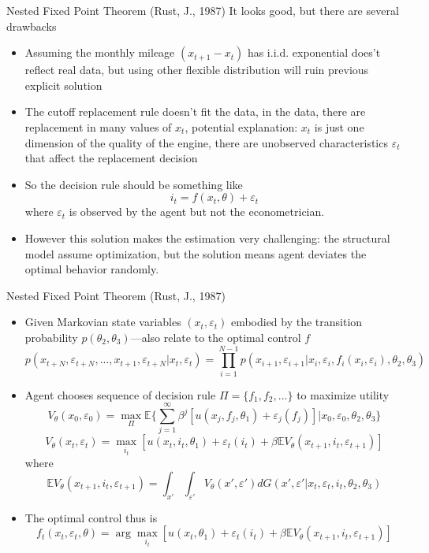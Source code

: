 \documentclass[10pt]{beamer}
\begin{document}
\begin{frame}{Nested Fixed Point Theorem (Rust, J., 1987)}
It looks good, but there are several drawbacks
\begin{itemize}
\item Assuming the monthly mileage $(x_{t+1}-x_t)$ has i.i.d. exponential does't reflect real data, but using other flexible distribution will ruin previous explicit solution
\item The cutoff replacement rule doesn't fit the data, in the data, there are replacement in many values of $x_t$, potential explanation: $x_t$ is just one dimension of the quality of the engine, there are unobserved characteristics $\varepsilon_t$ that affect the replacement decision
\item So the decision rule should be something like
 $$i_t = f(x_t,\theta)+\varepsilon_t$$
where $\varepsilon_t$ is observed by the agent but not the econometrician.
\item However this solution makes the estimation very challenging: the structural model assume optimization, but the solution means agent deviates the optimal behavior randomly.
\end{itemize}
\end{frame}


\begin{frame}{Nested Fixed Point Theorem (Rust, J., 1987)}
\begin{itemize}
\item Given Markovian state variables $(x_t,\varepsilon_t)$ embodied by the transition probability $p(\theta_2,\theta_3)$---also relate to the optimal control $f$
$$p(x_{t+N},\varepsilon_{t+N},...,x_{t+1},\varepsilon_{t+N}|x_t,\varepsilon_t)=\prod_{i=1}^{N-1}p(x_{i+1},\varepsilon_{i+1}|x_i,\varepsilon_i,f_i(x_i,\varepsilon_i),\theta_2,\theta_3)$$
\item Agent chooses sequence of decision rule $\Pi=\{f_1,f_2,...\}$ to maximize utility
 $$V_\theta(x_0,\varepsilon_0)=\max_{\Pi}\mathbb{E}\bigg\{\sum_{j=1}^{\infty}\beta^j[u(x_j,f_j,\theta_1)+\varepsilon_j(f_j)]|x_0,\varepsilon_0,\theta_2,\theta_3\bigg\}$$
 $$V_\theta(x_t,\varepsilon_t) = \max_{i_t}[u(x_t,i_t,\theta_1)+\varepsilon_t(i_t)+\beta\mathbb{E}V_\theta(x_{t+1},i_t,\varepsilon_{t+1})]$$
 where
 $$\mathbb{E}V_\theta(x_{t+1},i_t,\varepsilon_{t+1})=\int_{x'}\int_{\varepsilon'}V_\theta(x',\varepsilon')d G(x',\varepsilon'|x_t,\varepsilon_t,i_t,\theta_2,\theta_3)$$
\item The optimal control thus is
$$f_t(x_t,\varepsilon_t,\theta) = \arg\max_{i_t}[u(x_t,\theta_1)+\varepsilon_t(i_t)+\beta\mathbb{E}V_\theta(x_{t+1},i_t,\varepsilon_{t+1})]$$
\end{itemize}
\end{frame}
\end{document}
